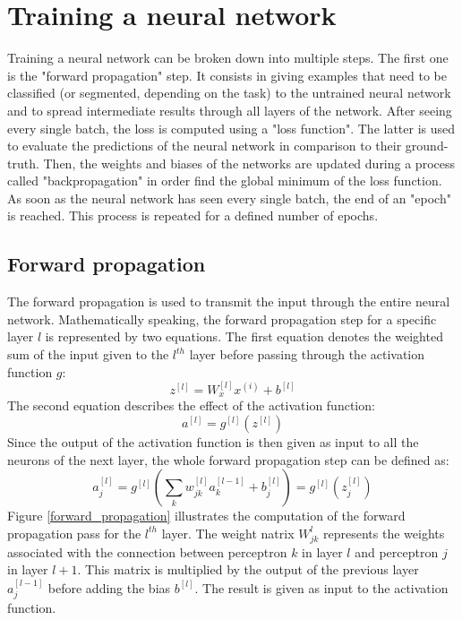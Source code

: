 \section{Training a neural network}
\label{training_a_neural_network}

\setlength{\marginparwidth}{3cm}\leavevmode {}Training a neural network can be broken down into multiple steps. The first one is the "forward propagation" step. It consists in giving examples that need to be classified (or segmented, depending on the task) to the untrained neural network and to spread intermediate results through all layers of the network. %
After seeing every single batch, the loss is computed using a "loss function". The latter is used to evaluate the predictions of the neural network in comparison to their ground-truth. Then, the weights and biases of the networks are updated during a process called "backpropagation" in order find the global minimum of the loss function. As soon as the neural network has seen every single batch, the end of an "epoch" is reached. This process is repeated for a defined number of epochs.


\subsection{Forward propagation}

\setlength{\marginparwidth}{3cm}\leavevmode {}The forward propagation is used to transmit the input through the entire neural network. Mathematically speaking, the forward propagation step for a specific layer $l$ is represented by two equations. The first equation denotes the weighted sum of the input given to the $l^{th}$ layer before passing through the activation function $g$: 
\begin{equation}
z^{[l]} = W_{x}^{[l]}x^{(i)} + b^{[l]}
\end{equation}
The second equation describes the effect of the activation function:
\begin{equation}
a^{[l]} = g^{[l]}(z^{[l]})
\end{equation}
Since the output of the activation function is then given as input to all the neurons of the next layer, the whole forward propagation step can be defined as:
\begin{equation}
a_{j}^{[l]} = g^{[l]} (\sum_{k} w_{jk}^{[l]}a_{k}^{[l-1]} + b_{j}^{[l]}) = g^{[l]} (z_{j}^{[l]}) 
\end{equation}
Figure \ref{forward_propagation} illustrates the computation of the forward propagation pass for the $l^{th}$ layer. The weight natrix $W_{jk}^{l}$ represents the weights associated with the connection between perceptron $k$ in layer $l$ and perceptron $j$ in layer $l+1$. This matrix is multiplied by the output of the previous layer $a_{j}^{[l-1]}$ before adding the bias $b^{[l]}$. The result is given as input to the activation function.


